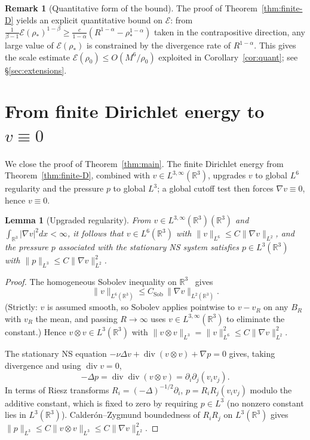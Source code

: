 \documentclass[11pt]{amsart}
\newtheorem{lemma}[theorem]{Lemma}
\theoremstyle{definition}
\newtheorem{remark}[theorem]{Remark}
\newcommand{\RR}{\mathbb{R}}
\newcommand{\EE}{\mathcal{E}}    %
\newcommand{\Lweak}[1]{L^{3,\infty}(\RR^{#1})}
\newcommand{\norm}[1]{\|#1\|}
\newcommand{\abs}[1]{|#1|}
\DeclareMathOperator{\dv}{div}
\begin{document}
\begin{remark}[Quantitative form of the bound]
\label{rem:quantitative}
The proof of Theorem~\ref{thm:finite-D} yields an explicit
quantitative bound on $\EE$: from $\frac{1}{\beta -
1}\EE(\rho_*)^{1 - \beta} \geq \frac{c}{1-\alpha}(R^{1-\alpha} -
\rho_*^{1-\alpha})$ taken in the contrapositive direction, any
large value of $\EE(\rho_*)$ is constrained by the divergence
rate of $R^{1-\alpha}$. This gives the scale estimate
$\EE(\rho_0) \leq O(M^6/\rho_0)$ exploited in
Corollary~\ref{cor:quant}; see \S\ref{sec:extensions}.
\end{remark}

\section{From finite Dirichlet energy to $v \equiv 0$}
\label{sec:vzero}

We close the proof of Theorem~\ref{thm:main}. The finite
Dirichlet energy from Theorem~\ref{thm:finite-D}, combined with
$v \in \Lweak{3}$, upgrades $v$ to global $L^6$ regularity and
the pressure $p$ to global $L^3$; a global cutoff test then
forces $\nabla v \equiv 0$, hence $v \equiv 0$.

\begin{lemma}[Upgraded regularity]\label{lem:upgrade}
From $v \in \Lweak{3}(\RR^3)$ and $\int_{\RR^3} \abs{\nabla v}^2
dx < \infty$, it follows that $v \in L^6(\RR^3)$ with
$\norm{v}_{L^6} \leq C \norm{\nabla v}_{L^2}$, and the pressure
$p$ associated with the stationary NS system satisfies $p \in
L^3(\RR^3)$ with $\norm{p}_{L^3} \leq C\norm{\nabla v}_{L^2}^2$.
\end{lemma}

\begin{proof}
The homogeneous Sobolev inequality on $\RR^3$~\cite[II.5]{Galdi}
gives
\[
\norm{v}_{L^6(\RR^3)} \leq C_{\mathrm{Sob}}\,\norm{\nabla v}_{L^2(\RR^3)}.
\]
(Strictly: $v$ is assumed smooth, so Sobolev applies pointwise to
$v - v_R$ on any $B_R$ with $v_R$ the mean, and passing $R \to
\infty$ uses $v \in \Lweak{3}$ to eliminate the constant.) Hence
$v \otimes v \in L^3(\RR^3)$ with $\norm{v \otimes v}_{L^3} =
\norm{v}_{L^6}^2 \leq C\norm{\nabla v}_{L^2}^2$.

The stationary NS equation $-\nu \Delta v + \dv(v \otimes v)
+ \nabla p = 0$ gives, taking divergence and using $\dv v = 0$,
\[
-\Delta p = \dv \dv (v \otimes v) = \partial_i \partial_j (v_i v_j).
\]
In terms of Riesz transforms $R_i = (-\Delta)^{-1/2}\partial_i$,
$p = R_i R_j (v_i v_j)$ modulo the additive constant, which is
fixed to zero by requiring $p \in L^3$ (no nonzero constant lies
in $L^3(\RR^3)$). Calder\'on--Zygmund boundedness of $R_iR_j$ on
$L^3(\RR^3)$ gives $\norm{p}_{L^3} \leq C\norm{v\otimes v}_{L^3}
\leq C\norm{\nabla v}_{L^2}^2$.
\end{proof}
\end{document}
